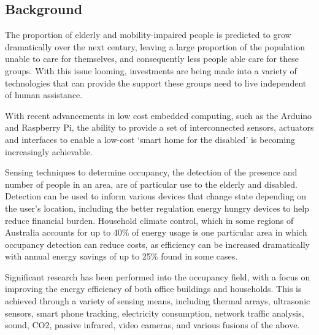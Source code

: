 \documentclass[../thesis/thesis.tex]{subfiles}
\begin{document}
\begin{bibunit}

\section{Background} 

The proportion of elderly and mobility-impaired people is predicted to grow dramatically over the next century, leaving a large proportion of the population unable to care for themselves, and consequently less people able care for these groups. \cite{chan2009smart} With this issue looming, investments are being made into a variety of technologies that can provide the support these groups need to live independent of human assistance. 

With recent advancements in low cost embedded computing, such as the Arduino \cite{Ardunio} and Raspberry Pi, \cite{RPi} the ability to provide a set of interconnected sensors, actuators and interfaces to enable a low-cost `smart home for the disabled' is becoming increasingly achievable.

Sensing techniques to determine occupancy, the detection of the presence and number of people in an area, are of particular use to the elderly and disabled. Detection can be used to inform various devices that change state depending on the user's location, including the better regulation energy hungry devices to help reduce financial burden. Household climate control, which in some regions of Australia accounts for up to 40\% of energy usage \cite{abs4602} is one particular area in which occupancy detection can reduce costs, as efficiency can be increased dramatically with annual energy savings of up to 25\% found in some cases. \cite{erickson2013thermosense}

Significant research has been performed into the occupancy field, with a focus on improving the energy efficiency of both office buildings and households. This is achieved through a variety of sensing means, including thermal arrays, \cite{beltran2013thermosense} ultrasonic sensors, \cite{hnat2012doorjamb} smart phone tracking, \cite{kleiminger2013using}\cite{balaji2013sentinel} electricity consumption, \cite{kleiminger2013occupancy} network traffic analysis, \cite{ting2013occupancy} sound, \cite{hailemariam2011real} CO2, \cite{hailemariam2011real} passive infrared, \cite{hailemariam2011real} video cameras, \cite{erickson2013poem} and various fusions of the above. \cite{yang2012multi}\cite{ting2013occupancy}



\end{bibunit}
\end{document}
